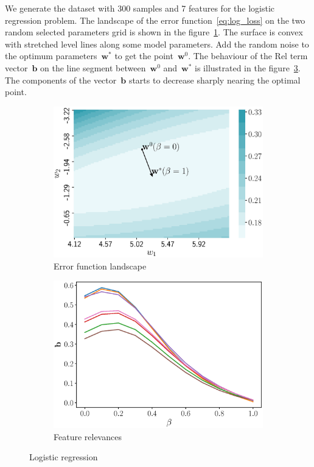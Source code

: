 \documentclass[a4paper,12pt]{article}
\theoremstyle{plain} %
\theoremstyle{definition} %
\theoremstyle{remark} %
\newcommand{\bb}{\mathbf{b}}
\newcommand{\bw}{\mathbf{w}}
\begin{document}
  	We generate the dataset with 300 samples and 7 features for the logistic regression problem. 
  	The landscape of the error function~\eqref{eq:log_loss} on the two random selected parameters grid is shown in the figure~\ref{fig:log_reg_error}.
  	The surface is convex with stretched level lines along some model parameters.
  	Add the random noise to the optimum parameters~$\bw^*$ to get the point~$\bw^0$. The behaviour of the Rel term vector~$\bb$ on the line segment between~$\bw^0$ and~$\bw^*$ is illustrated in the figure~\ref{fig:log_reg_b_wrt_beta}.
  	The components of the vector~$\bb$ starts to decrease sharply nearing the optimal point.
	\begin{figure}[!h]
		\centering
		\begin{subfigure}{.5\textwidth}
			\centering
			\includegraphics[width=\linewidth]{figs/log_reg_error}
			\caption{Error function landscape}
			\label{fig:log_reg_error}
		\end{subfigure}%
		\begin{subfigure}{.5\textwidth}
			\centering
			\includegraphics[width=\linewidth]{figs/log_reg_b_wrt_beta.eps}
			\caption{Feature relevances}
			\label{fig:log_reg_b_wrt_beta}
		\end{subfigure}
		\caption{Logistic regression}
	\end{figure}
  	
\end{document}
